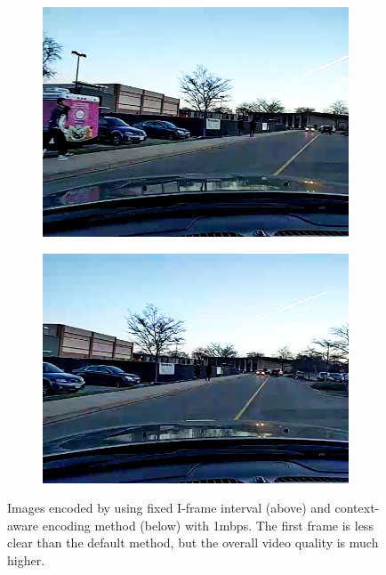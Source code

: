 \begin{figure}[ht]
\begin{subfigure}[t]{0.25\textwidth}
    \includegraphics[width=\linewidth]{Figs/RTDrive/evaluation/frames/context_2.png}
  \end{subfigure}%
  \begin{subfigure}[t]{0.25\textwidth}
    \includegraphics[width=\linewidth]{Figs/RTDrive/evaluation/frames/context_3.png}
  \end{subfigure}%
  \caption{Images encoded by using fixed I-frame interval (above) and 
          context-aware encoding method (below) with 1mbps.
         The first frame is less clear than the default method, but the overall
         video quality is much higher. }
  \label{context_encoding_images}
\end{figure}


